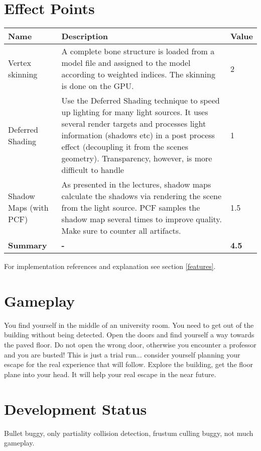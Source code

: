 \documentclass[12pt]{article}
\begin{document}
\section{Effect Points}


\begin{table}[h!]
  \centering
  \label{effectsTable}
  \begin{tabular}{l|p{10cm}|l}
    \textbf{Name} & \textbf{Description} & \textbf{Value}\\ \hline
      Vertex skinning & A complete bone structure is loaded from a model file and assigned to the model according to weighted indices. The skinning is done on the GPU. & 2	\\ \hline
      Deferred Shading & 	Use the Deferred Shading technique to speed up lighting for many light sources. It uses several render targets and processes light information (shadows etc) in a post process effect (decoupling it from the scenes geometry). Transparency, however, is more difficult to handle & 1\\ \hline
      Shadow Maps (with PCF) & 	As presented in the lectures, shadow maps calculate the shadows via rendering the scene from the light source. PCF samples the shadow map several times to improve quality. Make sure to counter all artifacts. & 1.5\\ \hline
      \textbf{Summary} & \textbf{-} & \textbf{4.5}\\
  \end{tabular}
\end{table}
For implementation references and explanation see section \ref{features}.



\section{Gameplay}
You find yourself in the middle of an university room. You need to get out of the building without being detected. Open the doors and find yourself a way towards the paved floor. Do not open the wrong door, otherwise you encounter a professor and you are busted!
This is just a trial run... consider yourself planning your escape for the real experience that will follow. Explore the building, get the floor plane into your head. It will help your real escape in the near future.


\section{Development Status}
Bullet buggy, only partiality collision detection, frustum culling buggy, not much gameplay.
\end{document}
